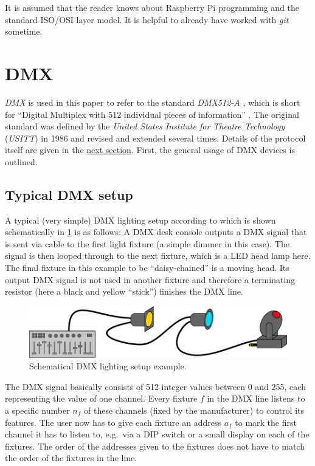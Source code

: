It is assumed that the reader knows about Raspberry Pi programming and
the standard ISO/OSI layer model. It is helpful to already have worked
with \emph{git} sometime.

\section{DMX}\label{dmx}

\emph{DMX} is used in this paper to refer to the standard
\emph{DMX512-A} \citep{esta-dmx512-a}, which is short for ``Digital
Multiplex with 512 individual pieces of information'' \citep{usitt-faq}.
The original standard was defined by the \emph{United States Institute
for Theatre Technology} (\emph{USITT}) in 1986 and revised and extended
several times. Details of the protocol itself are given in the
\protect\hyperlink{sec:dmx-protocol}{next section}. First, the general
usage of DMX devices is outlined.

\subsection{Typical DMX setup}\label{typical-dmx-setup}

A typical (very simple) DMX lighting setup according to
\citep{bennette-practice} which is shown schematically in
\cref{fig:dmx-line} is as follows: A DMX desk console outputs a DMX
signal that is sent via cable to the first light fixture (a simple
dimmer in this case). The signal is then looped through to the next
fixture, which is a LED head lamp here. The final fixture in this
example to be ``daisy-chained'' is a moving head. Its output DMX signal
is not used in another fixture and therefore a terminating resistor
(here a black and yellow ``stick'') finishes the DMX line.

\begin{figure}
\centering
\includegraphics[width=1.00000\textwidth]{Bilder/dmx-line-diagram.pdf}
\caption[Schematical DMX lighting setup example]{Schematical DMX lighting setup example.}\label{fig:dmx-line}
\end{figure}

The DMX signal basically consists of 512 integer values between 0 and
255, each representing the value of one channel. Every fixture \(f\) in
the DMX line listens to a specific number \(n_f\) of these channels
(fixed by the manufacturer) to control its features. The user now has to
give each fixture an address \(a_f\) to mark the first channel it has to
listen to, e.g.~via a DIP switch or a small display on each of the
fixtures. The order of the addresses given to the fixtures does not have
to match the order of the fixtures in the line.

